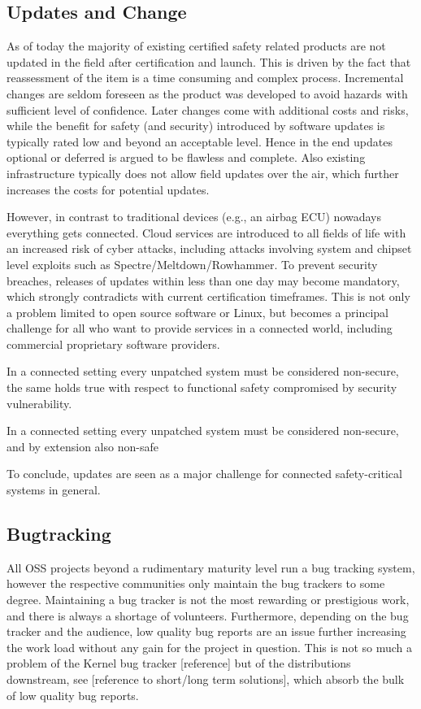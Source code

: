 \documentclass[12pt]{ElisaPaper}
\begin{document}
\subsection{Updates and Change}
\label{ssec:Updates and Change}
As of today the majority of existing certified safety related products are not updated in the field after certification and launch. This is driven by the fact that reassessment of the item is a time consuming and complex process. Incremental changes are seldom foreseen as the product was developed to avoid hazards with sufficient level of confidence. Later changes come with additional costs and risks, while the benefit for safety (and security) introduced by software updates is typically rated low and beyond an acceptable level. Hence in the end updates optional or deferred is argued to be flawless and complete. Also existing infrastructure typically does not allow field updates over the air, which further increases the costs for potential updates. 

However, in contrast to traditional devices (e.g., an airbag ECU) nowadays everything gets connected. Cloud services are introduced to all fields of life with an increased risk of cyber attacks, including attacks involving system and chipset level exploits such as  Spectre/Meltdown/Rowhammer. 
To prevent security breaches, releases of updates within less than one day may become mandatory, which strongly contradicts with current certification timeframes. This is not only a problem limited to open source software or Linux, but becomes a principal challenge for all who want to provide services in a connected world, including commercial proprietary software providers.

In a connected setting every unpatched system must be considered non-secure, the same holds true with respect to functional safety compromised by security vulnerability.

In a connected setting every unpatched system must be considered non-secure, and by extension also non-safe

To conclude, updates are seen as a major challenge for connected safety-critical systems in general.


\subsection{Bugtracking}
All OSS projects beyond a rudimentary maturity level run a bug tracking system, however the respective communities only maintain the bug trackers to some degree.
Maintaining a bug tracker is not the most rewarding or prestigious work, and there is always a shortage of volunteers.
Furthermore, depending on the bug tracker and the audience, low quality bug reports are an issue further increasing the work load without any gain for the project in question.
This is not so much a problem of the Kernel bug tracker [reference] but of the distributions downstream, see [reference to short/long term solutions], which absorb the bulk of low quality bug reports.
\end{document}
